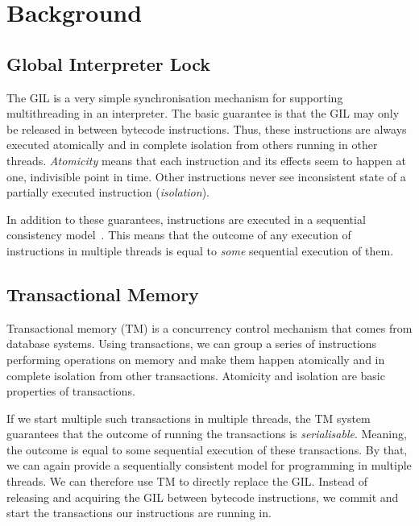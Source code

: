 \documentclass{sigplanconf}
\begin{document}

\section{Background}

\subsection{Global Interpreter Lock}

The GIL is a very simple synchronisation mechanism for supporting
multithreading in an interpreter. The basic guarantee is that the GIL
may only be released in between bytecode instructions. Thus, these
instructions are always executed atomically and in complete isolation
from others running in other threads. \emph{Atomicity} means that each
instruction and its effects seem to happen at one, indivisible point
in time. Other instructions never see inconsistent state of a
partially executed instruction (\emph{isolation}).

In addition to these guarantees, instructions are executed in a
sequential consistency model~\cite{lamport79}. This means that
the outcome of any execution of instructions in multiple threads is
equal to \emph{some} sequential execution of them.


\subsection{Transactional Memory}

Transactional memory (TM) is a concurrency control mechanism that
comes from database systems. Using transactions, we can group a series
of instructions performing operations on memory and make them happen
atomically and in complete isolation from other transactions.
Atomicity and isolation are basic properties of transactions.

If we start multiple such transactions in multiple threads, the TM
system guarantees that the outcome of running the transactions is
\emph{serialisable}. Meaning, the outcome is equal to some sequential
execution of these transactions. By that, we can again provide a
sequentially consistent model for programming in multiple threads. We
can therefore use TM to directly replace the GIL. Instead of releasing
and acquiring the GIL between bytecode instructions, we commit and
start the transactions our instructions are running in.
\end{document}
